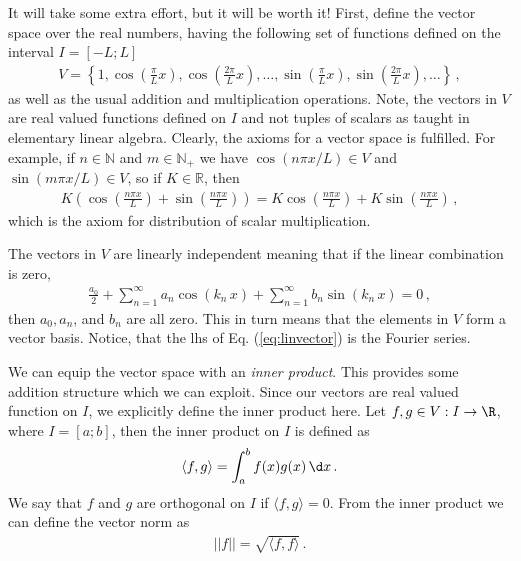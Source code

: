  It will take some extra effort, but
it will be worth it! First, define the vector space over the real numbers,
having the following set of functions defined on the interval $I=[-L; L]$
\begin{eqnarray}
	V = \left \{ 1, \cos\left(\frac{\pi}{L}x\right), 
	\cos\left(\frac{2\pi}{L} x\right), \ldots, \sin\left(\frac{\pi}{L}x\right), 
	\sin\left(\frac{2\pi}{L}x \right), \ldots \right \} \, ,
\end{eqnarray}
as well as the usual addition and multiplication operations. 
Note, the vectors in $V$ are real valued functions defined on $I$ and not tuples of 
scalars as taught in elementary linear algebra. Clearly, the axioms for a vector space is fulfilled. 
For example, if $n\in \mathbb{N}$ and $m \in
\mathbb{N}_+$ we have $\cos(n \pi x/L) \in V$ and $\sin(m \pi x/L) \in V$, so if
$K \in  \mathbb{R}$, then
\begin{eqnarray}
	K\left(\cos\left(\frac{n\pi x}{L}\right) + 
	\sin\left(\frac{n \pi x}{L}\right)\right)  = 
	K\cos\left(\frac{n\pi x}{L}\right) + K\sin\left(\frac{n \pi x}{L}\right)\, , 
\end{eqnarray}
which is the axiom for distribution of scalar multiplication. 

The vectors in $V$ are linearly independent meaning that if the linear
combination is zero,
\begin{eqnarray}
	\label{eq:linvector}
\frac{a_0}{2} + \sum_{n=1}^\infty a_n \cos\left(k_n \, x\right) 
	+ \sum_{n=1}^\infty b_n \sin\left(k_n\, x\right) = 0 \, ,
\end{eqnarray}
then $a_0, a_n$, and $b_n$ are all zero. This in turn means that the elements in $V$ form a
vector basis. Notice, that the lhs of Eq. (\ref{eq:linvector}) is the Fourier series. 

We can equip the vector space with an \emph{inner product}. This provides 
some addition structure which we can exploit. Since our vectors are real
valued function on $I$, we explicitly define the inner product here.  
Let $f,g \in V: I \rightarrow \R$, where $I = [a; b]$, then the inner product 
on $I$ is defined as
\begin{eqnarray}
	\langle f,g\rangle= \int_a^b f(x) g(x) \, \d x \, .
\end{eqnarray}
We say that $f$ and $g$ are orthogonal on $I$ if $\langle f,g \rangle = 0$. From
the inner product we can define the vector norm as 
\begin{eqnarray}
	|| f || = \sqrt{\langle f, f\rangle} \, .
\end{eqnarray}


